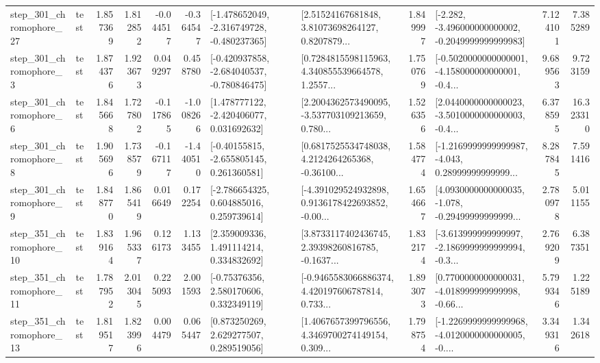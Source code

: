 \begin{tabular}{llrrrrllrlrr}
  step\_301\_chromophore\_27 &      test &      1.857369 &    1.812852 &     -0.044517 & -0.364547 &  [-1.478652049, -2.316749728, -0.480237365] &  [2.51524167681848, 3.81073698264127, 0.8207879... &       1.849997 &  [-2.282, -3.496000000000002, -0.2049999999999983] &            7.124101 &          7.385289 \\
   step\_301\_chromophore\_3 &      test &      1.874376 &    1.923673 &      0.049297 &  0.458780 &  [-0.420937858, -2.684040537, -0.780846475] &  [0.7284815598115963, 4.340855539664578, 1.2557... &       1.750769 &  [-0.5020000000000001, -4.158000000000001, -0.4... &            9.689563 &          9.723159 \\
   step\_301\_chromophore\_6 &      test &      1.845668 &    1.727802 &     -0.117865 & -1.008266 &    [1.478777122, -2.420406077, 0.031692632] &  [2.2004362573490095, -3.537703109213659, 0.780... &       1.526356 &  [2.0440000000000023, -3.5010000000000003, -0.4... &            6.378595 &         16.323310 \\
   step\_301\_chromophore\_8 &      test &      1.905696 &    1.738579 &     -0.167117 & -1.440510 &    [-0.40155815, -2.655805145, 0.261360581] &  [0.6817525534748038, 4.2124264265368, -0.36100... &       1.584774 &  [-1.2169999999999987, -4.043, 0.28999999999999... &            8.287845 &          7.591416 \\
   step\_301\_chromophore\_9 &      test &      1.848770 &    1.865419 &      0.016649 &  0.172254 &    [-2.786654325, 0.604885016, 0.259739614] &  [-4.391029524932898, 0.9136178422693852, -0.00... &       1.654667 &  [4.0930000000000035, -1.078, -0.29499999999999... &            2.780978 &          5.011155 \\
  step\_351\_chromophore\_10 &      test &      1.839164 &    1.965337 &      0.126173 &  1.133455 &     [2.359009336, 1.491114214, 0.334832692] &  [3.8733117402436745, 2.39398260816785, -0.1637... &       1.832174 &  [-3.613999999999997, -2.1869999999999994, -0.3... &            2.769209 &          6.387351 \\
  step\_351\_chromophore\_11 &      test &      1.787952 &    2.013045 &      0.225093 &  2.001593 &     [-0.75376356, 2.580170606, 0.332349119] &  [-0.9465583066886374, 4.420197606787814, 0.733... &       1.893073 &  [0.7700000000000031, -4.018999999999998, -0.66... &            5.799346 &          1.225189 \\
  step\_351\_chromophore\_13 &      test &      1.819517 &    1.823996 &      0.004479 &  0.065447 &     [0.873250269, 2.629277507, 0.289519056] &  [1.4067657399796556, 4.3469700274149154, 0.309... &       1.798754 &  [-1.2269999999999968, -4.0120000000000005, -0.... &            3.349316 &          1.342618 \\

\end{tabular}
